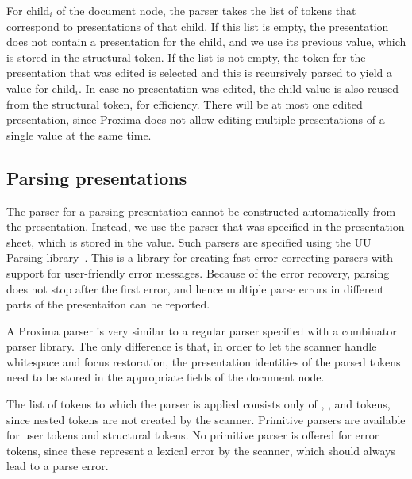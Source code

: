 \documentclass[12pt]{article}
\begin{document}
For child$_i$ of the document node, the parser takes the list of tokens that correspond to presentations of that child. If this list is empty, the presentation does not contain a presentation for the child, and we use its previous value, which is stored in the structural token. If the list is not empty, the token for the presentation that was edited is selected and this is recursively parsed to yield a value for child$_i$. In case no presentation was edited, the child value is also reused from the structural token, for efficiency. There will be at most one edited presentation, since Proxima does not allow editing multiple presentations of a single value at the same time. 




\subsection{Parsing presentations}

The parser for a parsing presentation cannot be constructed automatically from the presentation. Instead, we use the parser that was specified in the presentation sheet, which is stored in the  value. Such parsers are specified using the UU Parsing library~\cite{swierstra03polishParsers, swierstra08parserCombinators}. This is a library for creating fast error correcting parsers with support for user-friendly error messages. Because of the error recovery, parsing does not stop after the first error, and hence multiple parse errors in different parts of the presentaiton can be reported. 

A Proxima parser is very similar to a regular parser specified with a combinator parser library. The only difference is that, in order to let the scanner handle whitespace and focus restoration, the presentation identities of the parsed tokens need to be stored in the appropriate fields of the document node. 

The list of tokens to which the parser is applied consists only of , , and  tokens, since nested  tokens are not created by the scanner. Primitive parsers are available for user tokens and structural tokens. No primitive parser is offered for error tokens, since these represent a lexical error by the scanner, which should always lead to a parse error.
\end{document}
